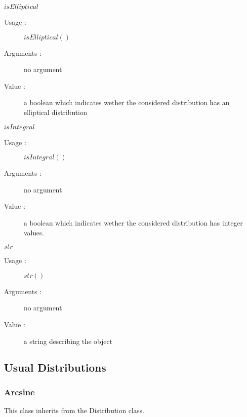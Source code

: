 \begin{description}
\begin{description}
  \item $isElliptical$
    \begin{description}
    \item[Usage :] $isElliptical()$
    \item[Arguments :] no argument
    \item[Value :] a boolean which indicates wether the considered distribution has an elliptical distribution
    \end{description}
    \bigskip

  \item $isIntegral$
    \begin{description}
    \item[Usage :] $isIntegral()$
    \item[Arguments :] no argument
    \item[Value :] a boolean which indicates wether the considered distribution has integer values.
    \end{description}
    \bigskip

  \item $str$
    \begin{description}
    \item[Usage :] $str()$
    \item[Arguments :] no argument
    \item[Value :] a string describing the object
    \end{description}
    \bigskip

  \end{description}

\end{description}

\newpage \subsection{Usual Distributions} \label{UsualDistributions}


\subsubsection{Arcsine}

This class inherits from the Distribution class.

